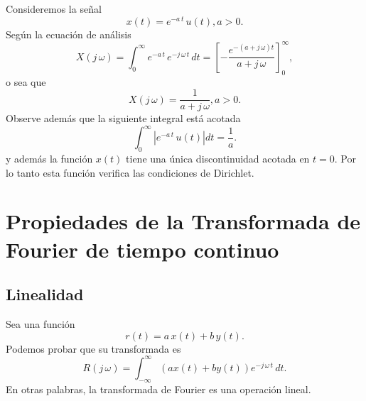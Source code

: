 Consideremos la se\~{n}al 
\begin{equation}
	x\left( t\right) = e^{-a \, t}\, u\left( t\right) , a>0.
\end{equation}
Seg\'{u}n la ecuaci\'{o}n de an\'{a}lisis 
\begin{equation}
	X\left( j \, \omega \right) =
	\int_{0}^{\infty }e^{-a \, t} \, e^{-j \, \omega \, t} \, dt=
	\left[ -\frac{e^{-\left( a+j \, \omega \right) t}}{a+j \, \omega }\right] _{0}^{\infty },
\end{equation}
o sea que 
\begin{equation}
	X\left(j \, \omega \right) =\frac{1}{a+j \, \omega }, a>0.
\end{equation}
Observe adem\'{a}s que la siguiente integral est\'{a} acotada
\begin{equation}
	\int_{0}^{\infty }\left| e^{-a \, t}\, u\left( t\right) \right| dt=\frac{1}a.
\end{equation}
y adem\'{a}s la funci\'{o}n $x(t)$ tiene una \'{u}nica discontinuidad acotada en $t = 0$. 
Por lo tanto esta funci\'{o}n verifica las condiciones de Dirichlet.


\section{Propiedades de la Transformada de Fourier de tiempo continuo}

\subsection{Linealidad}

Sea una funci\'{o}n
\begin{equation}
        r\left( t\right) = a \, x\left( t\right) +b \, y\left( t\right).
\end{equation}
Podemos probar que su transformada es
\begin{equation}
        R\left( j \, \omega \right) =
        \int_{-\infty }^{\infty }\left( ax\left( t\right)+by\left( t\right) \right) e^{-j \, \omega \, t} \, dt.
\end{equation}
En otras palabras, la transformada de Fourier es una operaci\'{o}n lineal.

